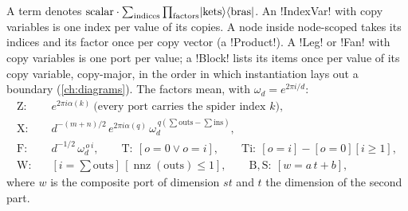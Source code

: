 \begin{definition}\label{def:language-term}
A term denotes $\text{scalar}\cdot\sum_{\text{indices}}\prod_{\text{factors}}\lvert \text{kets} \rangle\langle \text{bras} \rvert$. An \py!IndexVar! with copy variables is one index per value of its copies. A node inside node-scoped \bboxes{} takes its indices and its factor once per copy vector (a \py!Product!). A \py!Leg! or \py!Fan! with copy variables is one port per value; a \py!Block! lists its items once per value of its copy variable, copy-major, in the order in which instantiation lays out a boundary (\cref{ch:diagrams}). The factors mean, with $\omega_d=e^{2\pi i/d}$:
\begin{align*}
\text{Z}:&\quad e^{2\pi i\alpha(k)}\ \text{(every port carries the spider index $k$)},\\
\text{X}:&\quad d^{-(m+n)/2}\,e^{2\pi i\alpha(q)}\,\omega_d^{\,q(\sum\text{outs}-\sum\text{ins})},\\
\text{F}:&\quad d^{-1/2}\,\omega_d^{\,o\,i},\qquad \text{T}:\ [o=0\lor o=i],\qquad \text{Ti}:\ [o=i]-[o=0][i\ge1],\\
\text{W}:&\quad [i=\textstyle\sum\text{outs}]\,[\operatorname{nnz}(\text{outs})\le1],\qquad \text{B},\text{S}:\ [w=a\,t+b],
\end{align*}
where $w$ is the composite port of dimension $st$ and $t$ the dimension of the second part.
\end{definition}

